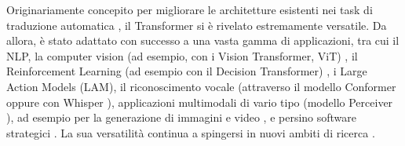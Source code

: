 Originariamente concepito per migliorare le architetture esistenti nei task di traduzione automatica \cite{wu2016googlesneuralmachinetranslation,luong2015effectiveapproachesattentionbasedneural,bahdanau2016neuralmachinetranslationjointly}, il Transformer si è rivelato estremamente versatile. Da allora, è stato adattato con successo a una vasta gamma di applicazioni, tra cui il NLP, la computer vision (ad esempio, con i Vision Transformer, ViT) \cite{Khan_2022}, il Reinforcement Learning \cite{zheng2023secretsrlhflargelanguage} (ad esempio con il Decision Transformer) \cite{chen2021decisiontransformerreinforcementlearning}, i Large Action Models (LAM), il riconoscimento vocale (attraverso il modello Conformer \cite{gulati2020conformerconvolutionaugmentedtransformerspeech} oppure con Whisper \cite{radford2022robustspeechrecognitionlargescale}), applicazioni multimodali di vario tipo (modello Perceiver \cite{jaegle2021perceivergeneralperceptioniterative,jaegle2022perceiveriogeneralarchitecture}), ad esempio per la generazione di immagini e video \cite{esser2024scalingrectifiedflowtransformers}, e persino software strategici \cite{ruoss2024grandmasterlevelchesssearch}. La sua versatilità continua a spingersi in nuovi ambiti di ricerca \cite{transformersstateofarthuggingface,choromanski2022rethinkingattentionperformers}.

